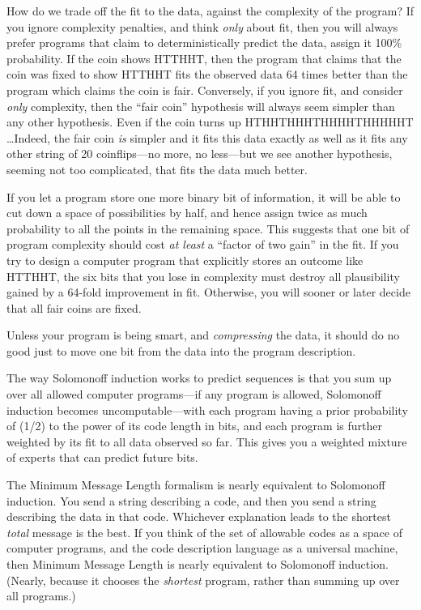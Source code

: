 {
 How do we trade off the fit to the data, against the complexity of
the program? If you ignore complexity penalties, and think
\textit{only} about fit, then you will always prefer programs that
claim to deterministically predict the data, assign it 100\%
probability. If the coin shows HTTHHT, then the program that claims
that the coin was fixed to show HTTHHT fits the observed data 64 times
better than the program which claims the coin is fair. Conversely, if
you ignore fit, and consider \textit{only} complexity, then the
``fair coin'' hypothesis will always
seem simpler than any other hypothesis. Even if the coin turns up
HTHHTHHHTHHHHTHHHHHT \ldots Indeed, the fair coin \textit{is} simpler
and it fits this data exactly as well as it fits any other string of 20
coinflips---no more, no less---but we see another hypothesis, seeming
not too complicated, that fits the data much better.}

{
 If you let a program store one more binary bit of information, it
will be able to cut down a space of possibilities by half, and hence
assign twice as much probability to all the points in the remaining
space. This suggests that one bit of program complexity should cost
\textit{at least} a ``factor of two
gain'' in the fit. If you try to design a computer
program that explicitly stores an outcome like HTTHHT, the six bits
that you lose in complexity must destroy all plausibility gained by a
64-fold improvement in fit. Otherwise, you will sooner or later decide
that all fair coins are fixed.}

{
 Unless your program is being smart, and \textit{compressing} the
data, it should do no good just to move one bit from the data into the
program description.}

{
 The way Solomonoff induction works to predict sequences is that
you sum up over all allowed computer programs---if any program is
allowed, Solomonoff induction becomes uncomputable---with each program
having a prior probability of (1/2) to the power of its code length in
bits, and each program is further weighted by its fit to all data
observed so far. This gives you a weighted mixture of experts that can
predict future bits.}

{
 The Minimum Message Length formalism is nearly equivalent to
Solomonoff induction. You send a string describing a code, and then you
send a string describing the data in that code. Whichever explanation
leads to the shortest \textit{total} message is the best. If you think
of the set of allowable codes as a space of computer programs, and the
code description language as a universal machine, then Minimum Message
Length is nearly equivalent to Solomonoff induction. (Nearly, because
it chooses the \textit{shortest} program, rather than summing up over
all programs.)}

